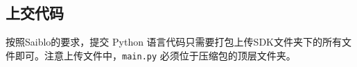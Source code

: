 \documentclass{article}
\begin{document}
\subsection{上交代码}

按照Saiblo的要求，提交 Python 语言代码只需要打包上传SDK文件夹下的所有文件即可。注意上传文件中，\texttt{main.py} 必须位于压缩包的顶层文件夹。
\end{document}
